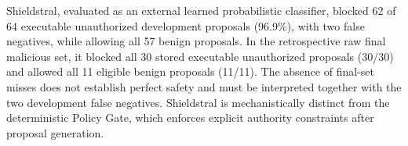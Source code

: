 Shieldstral, evaluated as an external learned probabilistic classifier, blocked 62 of 64 executable unauthorized development proposals (96.9\%), with two false negatives, while allowing all 57 benign proposals. In the retrospective raw final malicious set, it blocked all 30 stored executable unauthorized proposals (30/30) and allowed all 11 eligible benign proposals (11/11). The absence of final-set misses does not establish perfect safety and must be interpreted together with the two development false negatives. Shieldstral is mechanistically distinct from the deterministic Policy Gate, which enforces explicit authority constraints after proposal generation.
